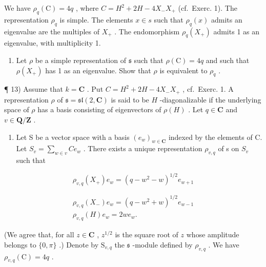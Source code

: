 We have \(\rho_{q}(\mathrm{C}) = 4q\) , where \(C = H^{2} + 2H - 4X_{-}X_{+}\) (cf.~Exerc. 1). The representation \(\rho_{q}\) is simple. The elements \(x \in s\) such that \(\rho_{q}(x)\) admits an eigenvalue are the multiples of \(X_{+}\) . The endomorphism \(\rho_{q}(X_{+})\) admits 1 as an eigenvalue, with multiplicity 1.

\begin{enumerate}
\def\labelenumi{\alph{enumi})}
\setcounter{enumi}{1}
\tightlist
\item
  Let \(\rho\) be a simple representation of \(\mathfrak{s}\) such that \(\rho(\mathrm{C}) = 4q\) and such that \(\rho(X_{+})\) has 1 as an eigenvalue. Show that \(\rho\) is equivalent to \(\rho_q\) .
\end{enumerate}

¶ 13) Assume that \(k = \mathbf{C}\) . Put \(C = H^2 + 2H - 4X_-X_+\) , cf.~Exerc. 1. A representation \(\rho\) of \(\mathfrak{s} = \mathfrak{sl}(2, \mathbf{C})\) is said to be \(H\) -diagonalizable if the underlying space of \(\rho\) has a basis consisting of eigenvectors of \(\rho(H)\) . Let \(q \in \mathbf{C}\) and \(v \in \mathbf{Q}/\mathbf{Z}\) .

\begin{enumerate}
\def\labelenumi{\alph{enumi})}
\tightlist
\item
  Let S be a vector space with a basis \((e_{w})_{w\in\mathbf{C}}\) indexed by the elements of C. Let \(S_{v}=\sum_{w\in v}Ce_{w}\) . There exists a unique representation \(\rho_{v,q}\) of s on \(S_{v}\) such that
\end{enumerate}

\[
\rho_ {v, q} (X _ {+}) e _ {w} = (q - w ^ {2} - w) ^ {1 / 2} e _ {w + 1}
\]

\[
\begin{array}{c} \rho_ {v, q} (X _ {-}) e _ {w} = (q - w ^ {2} + w) ^ {1 / 2} e _ {w - 1} \\ \rho_ {v, q} (H) e _ {w} = 2 w e _ {w}. \end{array}
\]

(We agree that, for all \(z \in \mathbf{C}\) , \(z^{1/2}\) is the square root of \(z\) whose amplitude belongs to \(\{0, \pi\}\) .) Denote by \(\mathrm{S}_{v,q}\) the \(\mathfrak{s}\) -module defined by \(\rho_{v,q}\) . We have \(\rho_{v,q}(\mathrm{C}) = 4q\) .

